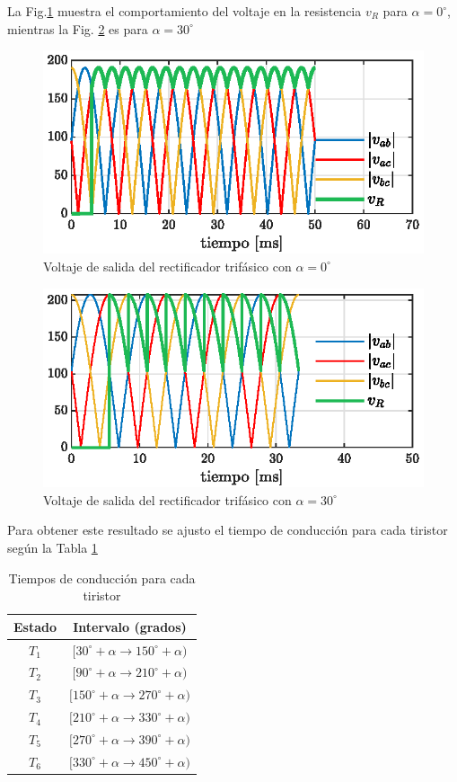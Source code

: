 \documentclass[conference]{IEEEtran}
\begin{document}
La Fig.\ref{fig:v_oi_cero} muestra el comportamiento del voltaje en la resistencia $v_R$ para $\alpha=0^\circ$,
mientras la Fig. \ref{fig:v_oi_tre} es para $\alpha=30^\circ$

\begin{figure}[ht]
	\centering
	\includegraphics[scale=1]{Fig/volt_lin_R.eps}
	\caption{Voltaje de salida del rectificador trifásico con $\alpha=0^\circ$}
	\label{fig:v_oi_cero}
\end{figure}

\begin{figure}[ht]
	\centering
	\includegraphics[scale=1]{Fig/volt_lin_R30.eps}
	\caption{Voltaje de salida del rectificador trifásico con $\alpha=30^\circ$}
	\label{fig:v_oi_tre}
\end{figure}
Para obtener este resultado se ajusto el tiempo de conducción para cada tiristor según la Tabla \ref{tab:angulos_disparo}
\begin{table}[h!]
	\centering
	\small
	\caption{Tiempos de conducción para cada tiristor}
	\begin{tabular}{@{}cc@{}}
		\toprule
		Estado & Intervalo (grados) \\ \midrule
	    $T_{1}$ & $[30^\circ+\alpha \rightarrow 150^\circ+\alpha)$ \\
		$T_{2}$ & $[90^\circ+\alpha \rightarrow 210^\circ+\alpha)$ \\
		$T_{3}$ & $[150^\circ+\alpha \rightarrow 270^\circ+\alpha)$ \\
		$T_{4}$ & $[210^\circ+\alpha \rightarrow 330^\circ+\alpha)$ \\
		$T_{5}$ & $[270^\circ+\alpha \rightarrow 390^\circ+\alpha)$ \\
		$T_{6}$ & $[330^\circ+\alpha \rightarrow 450^\circ+\alpha)$ \\ \bottomrule
	\end{tabular}
	\label{tab:angulos_disparo}
\end{table}
\end{document}
